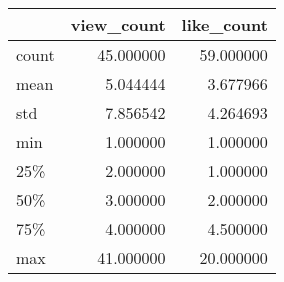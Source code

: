 \begin{tabular}{lrr}
\toprule
 & view_count & like_count \\
\midrule
count & 45.000000 & 59.000000 \\
mean & 5.044444 & 3.677966 \\
std & 7.856542 & 4.264693 \\
min & 1.000000 & 1.000000 \\
25\% & 2.000000 & 1.000000 \\
50\% & 3.000000 & 2.000000 \\
75\% & 4.000000 & 4.500000 \\
max & 41.000000 & 20.000000 \\
\bottomrule
\end{tabular}
